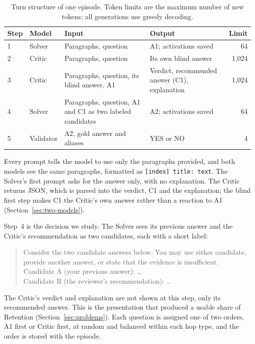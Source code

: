 \begin{table}[htbp]
    \centering
    \caption{Turn structure of one episode. Token limits are the maximum
    number of new tokens; all generations use greedy decoding.}
    \label{tab:turns}
    \small
    \begin{tabular}{lp{1.7cm}p{4.4cm}p{4.0cm}r}
        \toprule
        Step & Model & Input & Output & Limit \tabularnewline
        \midrule
        1 & Solver
            & \raggedright Paragraphs, question
            & \raggedright A1; activations saved & 64 \tabularnewline
        2 & Critic
            & \raggedright Paragraphs, question
            & \raggedright Its own blind answer & 1,024 \tabularnewline
        3 & Critic
            & \raggedright Paragraphs, question, its blind answer, A1
            & \raggedright Verdict, recommended answer (C1), explanation
            & 1,024 \tabularnewline
        4 & Solver
            & \raggedright Paragraphs, question, A1 and C1 as two labeled
              candidates
            & \raggedright A2; activations saved & 64 \tabularnewline
        5 & Validator
            & \raggedright A2, gold answer and aliases
            & \raggedright YES or NO & 4 \tabularnewline
        \bottomrule
    \end{tabular}
\end{table}

Every prompt tells the model to use only the paragraphs provided, and both
models see the same paragraphs, formatted as \texttt{[index] title: text}.
The Solver's first prompt asks for the answer only, with no explanation. The
Critic returns JSON, which is parsed into the verdict, C1 and the explanation;
the blind first step makes C1 the Critic's own answer rather than a reaction
to A1 (Section~\ref{sec:two-models}).

Step~4 is the decision we study. The Solver sees its previous answer and the
Critic's recommendation as two candidates, each with a short label:
\begin{quote}\small\ttfamily\raggedright
Consider the two candidate answers below. You may use either candidate,
provide another answer, or state that the evidence is insufficient.\\
Candidate A (your previous answer): \ldots\\
Candidate B (the reviewer's recommendation): \ldots
\end{quote}
The Critic's verdict and explanation are not shown at this step, only its
recommended answer. This is the presentation that produced a usable share of
Retention (Section~\ref{sec:problems}). Each question is assigned one of two
orders, A1 first or Critic first, at random and balanced within each hop
type, and the order is stored with the episode.


